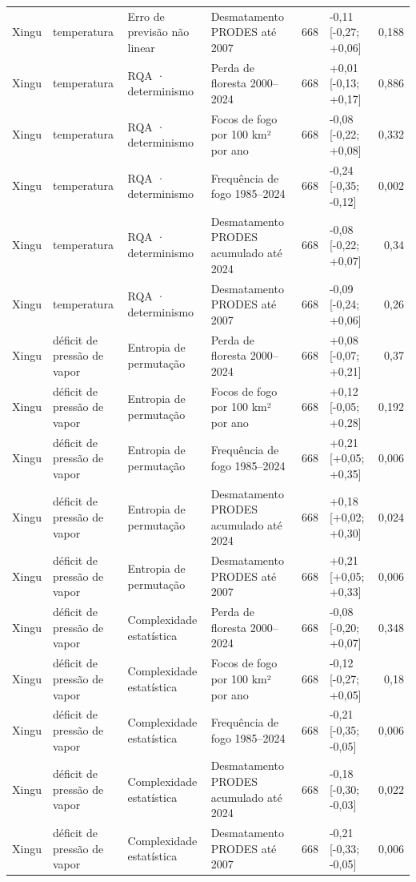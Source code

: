\begin{table}
{\begin{tabular}{llllrlr}
Xingu & temperatura & Erro de previsão não linear & Desmatamento PRODES até 2007 & 668 & -0,11 [-0,27; +0,06] & 0,188 \\
Xingu & temperatura & RQA · determinismo & Perda de floresta 2000–2024 & 668 & +0,01 [-0,13; +0,17] & 0,886 \\
Xingu & temperatura & RQA · determinismo & Focos de fogo por 100 km² por ano & 668 & -0,08 [-0,22; +0,08] & 0,332 \\
Xingu & temperatura & RQA · determinismo & Frequência de fogo 1985–2024 & 668 & -0,24 [-0,35; -0,12] & 0,002 \\
Xingu & temperatura & RQA · determinismo & Desmatamento PRODES acumulado até 2024 & 668 & -0,08 [-0,22; +0,07] & 0,34 \\
Xingu & temperatura & RQA · determinismo & Desmatamento PRODES até 2007 & 668 & -0,09 [-0,24; +0,06] & 0,26 \\
Xingu & déficit de pressão de vapor & Entropia de permutação & Perda de floresta 2000–2024 & 668 & +0,08 [-0,07; +0,21] & 0,37 \\
Xingu & déficit de pressão de vapor & Entropia de permutação & Focos de fogo por 100 km² por ano & 668 & +0,12 [-0,05; +0,28] & 0,192 \\
Xingu & déficit de pressão de vapor & Entropia de permutação & Frequência de fogo 1985–2024 & 668 & +0,21 [+0,05; +0,35] & 0,006 \\
Xingu & déficit de pressão de vapor & Entropia de permutação & Desmatamento PRODES acumulado até 2024 & 668 & +0,18 [+0,02; +0,30] & 0,024 \\
Xingu & déficit de pressão de vapor & Entropia de permutação & Desmatamento PRODES até 2007 & 668 & +0,21 [+0,05; +0,33] & 0,006 \\
Xingu & déficit de pressão de vapor & Complexidade estatística & Perda de floresta 2000–2024 & 668 & -0,08 [-0,20; +0,07] & 0,348 \\
Xingu & déficit de pressão de vapor & Complexidade estatística & Focos de fogo por 100 km² por ano & 668 & -0,12 [-0,27; +0,05] & 0,18 \\
Xingu & déficit de pressão de vapor & Complexidade estatística & Frequência de fogo 1985–2024 & 668 & -0,21 [-0,35; -0,05] & 0,006 \\
Xingu & déficit de pressão de vapor & Complexidade estatística & Desmatamento PRODES acumulado até 2024 & 668 & -0,18 [-0,30; -0,03] & 0,022 \\
Xingu & déficit de pressão de vapor & Complexidade estatística & Desmatamento PRODES até 2007 & 668 & -0,21 [-0,33; -0,05] & 0,006 \\

\end{tabular}}
\end{table}
